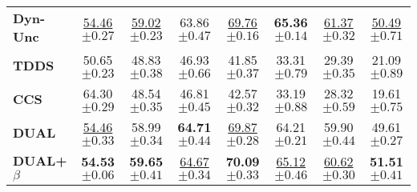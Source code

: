 \begin{table}[ht]
\begin{tabular}{lccccccc}
    \textbf{Dyn-Unc} & \underline{54.46} \scriptsize{$\pm 0.27$} & \underline{59.02} \scriptsize{$\pm 0.23 $} & 63.86 \scriptsize{$\pm 0.47 $} & \underline{69.76} \scriptsize{$\pm 0.16 $} & \textbf{65.36} \scriptsize{$\pm 0.14$} & \underline{61.37} \scriptsize{$\pm 0.32 $} & \underline{50.49} \scriptsize{$\pm 0.71$} \\
    
    \textbf{TDDS} & 50.65 \scriptsize{$\pm 0.23 $} & 48.83 \scriptsize{$\pm 0.38 $} & 46.93 \scriptsize{$\pm 0.66 $} &  41.85 \scriptsize{$\pm 0.37 $} & 33.31 \scriptsize{$\pm 0.79 $} & 29.39 \scriptsize{$\pm 0.35 $} & 21.09 \scriptsize{$\pm 0.89 $} \\
    
    \textbf{CCS} & 64.30 \scriptsize{$\pm 0.29 $} & 48.54 \scriptsize{$\pm 0.35 $} & 46.81 \scriptsize{$\pm 0.45 $} & 42.57 \scriptsize{$\pm 0.32 $} & 33.19 \scriptsize{$\pm 0.88 $} & 28.32 \scriptsize{$\pm 0.59 $} & 19.61 \scriptsize{$\pm 0.75 $} \\
    
    \midrule
    
    \textbf{DUAL} & \underline{54.46} \scriptsize{$\pm 0.33 $} & 58.99 \scriptsize{$\pm 0.34 $} & \textbf{64.71} \scriptsize{$\pm 0.44 $} & \underline{69.87} \scriptsize{$\pm 0.28 $} & 64.21 \scriptsize{$\pm 0.21 $} & 59.90 \scriptsize{$\pm 0.44 $} & 49.61 \scriptsize{$\pm 0.27 $} \\
    
    \textbf{DUAL+$\beta$} & \textbf{54.53} \scriptsize{$\pm 0.06 $} & \textbf{59.65} \scriptsize{$\pm 0.41 $} & \underline{64.67} \scriptsize{$\pm 0.34 $} & \textbf{70.09} \scriptsize{$\pm 0.33 $} & \underline{65.12} \scriptsize{$\pm 0.46$} & \underline{60.62} \scriptsize{$\pm 0.30 $} & \textbf{51.51} \scriptsize{$\pm 0.41 $} \\
    
    \bottomrule
\end{tabular}
\end{table}



